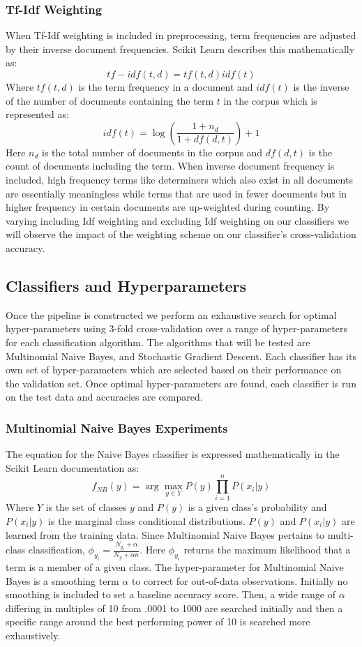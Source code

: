 \documentclass[a4paper, 12pt]{article}
\begin{document}
\subsubsection{Tf-Idf Weighting}
When Tf-Idf weighting is included in preprocessing, term frequencies are adjusted by their inverse document frequencies. Scikit Learn \cite{pedregosa2011scikit} describes this mathematically as: 
\[tf-idf(t,d)=tf(t,d)idf(t)\]
Where $tf(t,d)$ is the term frequency in a document and $idf(t)$ is the inverse of the number of documents containing the term $t$ in the corpus which is represented as:
\[idf(t)=\log(\frac{1+n_d}{1+df(d,t)}) +1\]
Here $n_d$ is the total number of documents in the corpus and $df(d,t)$ is the count of documents including the term. When inverse document frequency is included, high frequency terms like determiners which also exist in all documents are essentially meaningless while terms that are used in fewer documents but in higher frequency in certain documents are up-weighted during counting.  By varying including Idf weighting and excluding Idf weighting on our classifiers we will observe the impact of the weighting scheme on our classifier's cross-validation accuracy.
\subsection{Classifiers and Hyperparameters}
Once the pipeline is constructed we perform an exhaustive search for optimal hyper-parameters using 3-fold cross-validation over a range of hyper-parameters for each classification algorithm. The algorithms that will be tested are Multinomial Naive Bayes, and Stochastic Gradient Descent.  Each classifier has its own set of hyper-parameters which are selected based on their performance on the validation set. Once optimal hyper-parameters are found, each classifier is run on the test data and accuracies are compared.
\subsubsection{Multinomial Naive Bayes Experiments}
The equation for the Naive Bayes classifier is expressed mathematically in the Scikit Learn documentation \cite{pedregosa2011scikit} as: \[f_{NB}(y)=\arg\max_{y\in Y} P(y) \prod_{i=1}^{n} P(x_i|y)\]
Where $Y$ is the set of classes $y$ and $P(y)$ is a given class's probability and $P(x_i|y)$ is the marginal class conditional distributions.  $P(y)$ and $P(x_i|y)$ are learned from the training data. Since Multinomial Naive Bayes pertains to multi-class classification, $\phi_{y_i}=\frac{N_{y_i}+\alpha}{N_y +\alpha n}$. Here $\phi_{y_i}$  returns the maximum likelihood that a term is a member of a given class. The hyper-parameter for Multinomial Naive Bayes is a smoothing term $\alpha$ to correct for out-of-data observations.  Initially no smoothing is included to set a baseline accuracy score. Then, a wide range of $\alpha$ differing in multiples of 10 from .0001 to 1000 are searched initially and then a specific range around the best performing power of 10 is searched more exhaustively.
\end{document}
